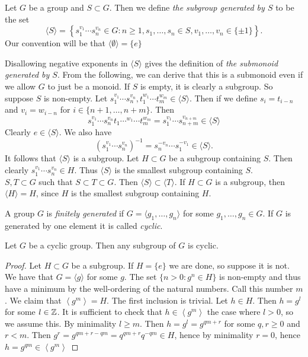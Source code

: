 \begin{definition}
    Let $G$ be a group and $S\subset G$. Then we define \textit{the subgroup generated by $S$} to be the set 
    $$\langle S \rangle = \left\{ s_1^{v_1}\cdots s_n^{v_n}\in G : n\geq 1, s_1,\dots,s_n\in S, v_1,\dots,v_n\in \{\pm 1\}\right\}.$$
    Our convention will be that $\langle \emptyset\rangle = \{e\}$
\end{definition}
\begin{remark}
    Disallowing negative exponents in $\langle S\rangle$ gives the definition of \textit{the submonoid generated by $S$}. From the following, we can derive that this is a submonoid even if we allow $G$ to just be a monoid. If $S$ is empty, it is clearly a subgroup. So suppose $S$ is non-empty. Let $s_1^{v_1}\cdots s_n^{v_n}, t_1^{w_1}\cdots t_m^{w_m} \in \langle S\rangle$. Then if we define $s_i = t_{i-n}$ and $v_i = w_{i-n}$ for $i\in\{n+1,\dots,n+m\}$. Then 
    $$s_1^{v_1}\cdots s_n^{v_n}t_1\cdots^{w_1}\cdots t_m^{w_m} = s_1^{v_1}\cdots s_{n+m}^{v_{n+m}} \in \langle S\rangle$$
    Clearly $e \in \langle S\rangle$. We also have 
    $$\left(s_1^{v_1}\cdots s_n^{v_n} \right)^{-1} = s_n^{-v_n}\cdots s_1^{-v_1} \in \langle S\rangle.$$
    It follows that $\langle S \rangle$ is a subgroup. Let $H\subset G$ be a subgroup containing $S$. Then clearly $s_1^{v_1}\cdots s_n^{v_n}\in H$. Thus $\langle S\rangle$ is the smallest subgroup containing $S$.\\
    $S,T\subset G$ such that $S\subset T \subset G$. Then $\langle S\rangle \subset \langle T\rangle$. If $H\subset G$ is a subgroup, then $\langle H\rangle = H$, since $H$ is the smallest subgroup containing $H$.
\end{remark}
\begin{definition}
    A group $G$ is \textit{finitely generated} if $G= \langle g_1,\dots,g_n\rangle$ for some $g_1,\dots,g_n\in G$. If $G$ is generated by one element it is called \textit{cyclic}.
\end{definition}
\begin{lemma}\label{EverySubgroupOfCyclicGroupIsCyclic}
    Let $G$ be a cyclic group. Then any subgroup of $G$ is cyclic.
\end{lemma}
\begin{proof}
    Let $H\subset G$ be a subgroup. If $H=\{e\}$ we are done, so suppose it is not. We have that $G = \langle g \rangle$ for some $g $. The set $\{n>0 : g^n \in H\}$ is non-empty and thus have a minimum by the well-ordering of the natural numbers. Call this number $m$. We claim that $\left\langle g^m\right\rangle = H$. The first inclusion is trivial. Let $h \in H$. Then $h= g^l$ for some $l\in \mathbb{Z}$. It is sufficient to check that $h\in \left\langle g^m\right\rangle $ the case where $l>0$, so we assume this. By minimality $l\geq m$. Then $h = g^l= g^{qm+r}$ for some $q,r\geq 0$ and $r< m$. Then $g^r= g^{qm+r-qm} = q^{qm+r}q^{-qm} \in H$, hence by minimality $r =0$, hence $h = g^{qm} \in \left\langle g^m\right\rangle $
\end{proof}
